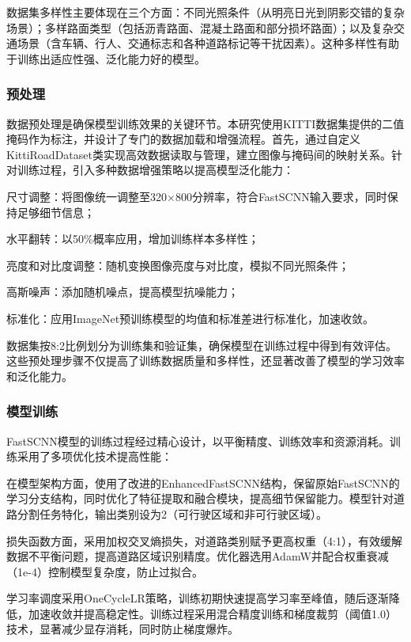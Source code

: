 \documentclass[a4paper, UTF8, fontsize=12pt]{ctexart} %
\numberwithin{equation}{section} %
\begin{document}
数据集多样性主要体现在三个方面：不同光照条件（从明亮日光到阴影交错的复杂场景）；多样路面类型（包括沥青路面、混凝土路面和部分损坏路面）；以及复杂交通场景（含车辆、行人、交通标志和各种道路标记等干扰因素）。这种多样性有助于训练出适应性强、泛化能力好的模型。

\subsubsection{预处理}
数据预处理是确保模型训练效果的关键环节。本研究使用KITTI数据集提供的二值掩码作为标注，并设计了专门的数据加载和增强流程。首先，通过自定义KittiRoadDataset类实现高效数据读取与管理，建立图像与掩码间的映射关系。针对训练过程，引入多种数据增强策略以提高模型泛化能力：
\begin{circledlist}
\item 尺寸调整：将图像统一调整至320×800分辨率，符合FastSCNN输入要求，同时保持足够细节信息；
\item 水平翻转：以50\%概率应用，增加训练样本多样性；
\item 亮度和对比度调整：随机变换图像亮度与对比度，模拟不同光照条件；
\item 高斯噪声：添加随机噪点，提高模型抗噪能力；
\item 标准化：应用ImageNet预训练模型的均值和标准差进行标准化，加速收敛。
\end{circledlist}
数据集按8:2比例划分为训练集和验证集，确保模型在训练过程中得到有效评估。这些预处理步骤不仅提高了训练数据质量和多样性，还显著改善了模型的学习效率和泛化能力。

\subsubsection{模型训练}
FastSCNN模型的训练过程经过精心设计，以平衡精度、训练效率和资源消耗。训练采用了多项优化技术提高性能：

在模型架构方面，使用了改进的EnhancedFastSCNN结构，保留原始FastSCNN的学习分支结构，同时优化了特征提取和融合模块，提高细节保留能力。模型针对道路分割任务特化，输出类别设为2（可行驶区域和非可行驶区域）。

损失函数方面，采用加权交叉熵损失，对道路类别赋予更高权重（4:1），有效缓解数据不平衡问题，提高道路区域识别精度。优化器选用AdamW并配合权重衰减（1e-4）控制模型复杂度，防止过拟合。

学习率调度采用OneCycleLR策略，训练初期快速提高学习率至峰值，随后逐渐降低，加速收敛并提高稳定性。训练过程采用混合精度训练和梯度裁剪（阈值1.0）技术，显著减少显存消耗，同时防止梯度爆炸。
\end{document}
